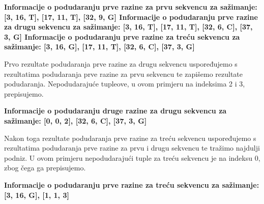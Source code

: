 \begin{minipage}{10cm}		
	\textbf{Informacije o podudaranju prve razine za prvu sekvencu za sažimanje:\newline
		 {[3, 16, T], [17, 11, T], [32, 9, G]}				\newline
		Informacije o podudaranju prve razine za drugu sekvencu za sažimanje: \newline 
		{[3, 16, T], [17, 11, T], [32, 6, C], [37, 3, G]}
		\newline
		Informacije o podudaranju prve razine za treću sekvencu za sažimanje: \newline 
		{[3, 16, G], [17, 11, T], [32, 6, C], [37, 3, G]}
		\newline
		}
\end{minipage}

Prvo rezultate podudaranja prve razine za drugu sekvencu uspoređujemo s rezultatima podudaranja prve razine za prvu sekvencu te zapišemo rezultate podudaranja. Nepodudarajuće tupleove, u ovom primjeru na indeksima 2 i 3, prepisujemo.\newline

\begin{minipage}{10cm}		
	\textbf{Informacije o podudaranju druge razine za drugu sekvencu za sažimanje:\newline
		 {[0, 0, 2], [32, 6, C], [37, 3, G]}					 \newline
	}
\end{minipage}

Nakon toga rezultate podudaranja prve razine za treću sekvencu uspoređujemo s rezultatima podudaranja prve razine za prvu i drugu sekvencu te tražimo najdulji podniz. U ovom primjeru nepodudarajući tuple za treću sekvencu je na indeksu 0, zbog čega ga prepisujemo.\newline

\begin{minipage}{10cm}		
	\textbf{Informacije o podudaranju prve razine za treću sekvencu za sažimanje: \newline 
		{[3, 16, G], [1, 1, 3]}
		\newline
		}
\end{minipage}


